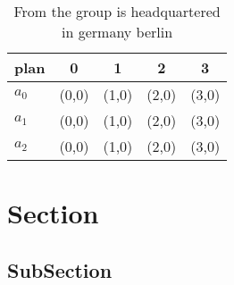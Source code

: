 \documentclass[a4paper]{article}
\begin{document}
\begin{table}
\begin{adjustbox}{width=0.5\columnwidth}
\begin{tabular}{|l|l|l|l|l|}
\hline
\textbf{plan} & \multicolumn{1}{c|}{\textbf{0}} & \multicolumn{1}{c|}{\textbf{1}} & \multicolumn{1}{c|}{\textbf{2}} & \multicolumn{1}{c|}{\textbf{3}} \\ \hline
\textbf{$a_0$}  & (0,0) & (1,0) & (2,0) & (3,0) \\ \hline
\textbf{$a_1$}  & (0,0) & (1,0) & (2,0) & (3,0) \\ \hline
\textbf{$a_2$}  & (0,0) & (1,0) & (2,0) & (3,0) \\ \hline
\end{tabular}
\end{adjustbox}
\caption{From the group is headquartered in germany berlin
}
\end{table}

\section{Section}

\subsection{SubSection}
\end{document}
